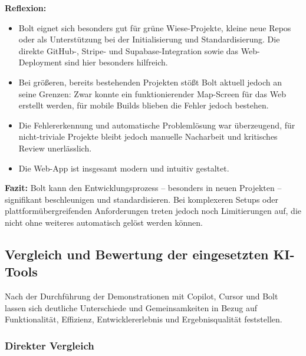 \textbf{Reflexion:}
\begin{itemize}
      \item Bolt eignet sich besonders gut für grüne Wiese-Projekte, kleine neue Repos oder
            als Unterstützung bei der Initialisierung und Standardisierung. Die direkte
            GitHub-, Stripe- und Supabase-Integration sowie das Web-Deployment sind hier
            besonders hilfreich.
      \item Bei größeren, bereits bestehenden Projekten stößt Bolt aktuell jedoch an seine
            Grenzen: Zwar konnte ein funktionierender Map-Screen für das Web erstellt
            werden, für mobile Builds blieben die Fehler jedoch bestehen.
      \item Die Fehlererkennung und automatische Problemlösung war überzeugend, für
            nicht-triviale Projekte bleibt jedoch manuelle Nacharbeit und kritisches Review
            unerlässlich.
      \item Die Web-App ist insgesamt modern und intuitiv gestaltet.
\end{itemize}

\textbf{Fazit:}
Bolt kann den Entwicklungsprozess – besonders in neuen Projekten – signifikant beschleunigen und standardisieren. Bei komplexeren Setups oder plattformübergreifenden Anforderungen treten jedoch noch Limitierungen auf, die nicht ohne weiteres automatisch gelöst werden können.

\subsection{Vergleich und Bewertung der eingesetzten KI-Tools}

Nach der Durchführung der Demonstrationen mit Copilot, Cursor und Bolt lassen
sich deutliche Unterschiede und Gemeinsamkeiten in Bezug auf Funktionalität,
Effizienz, Entwicklererlebnis und Ergebnisqualität feststellen.

\subsubsection{Direkter Vergleich}

